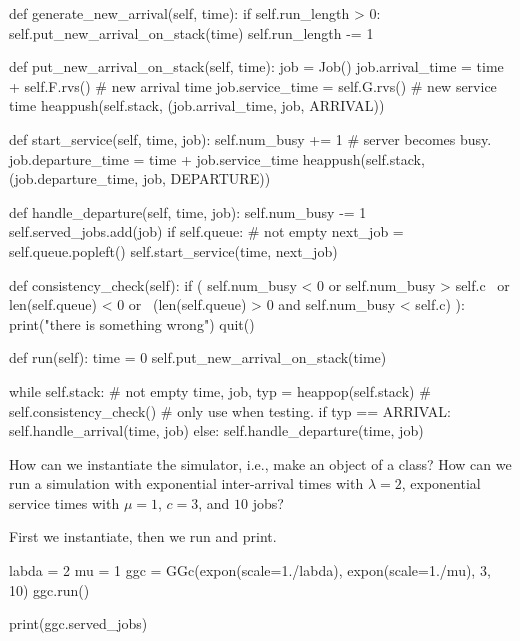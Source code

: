 \begin{exercise}
\begin{solution}
\begin{pyverbatim}
    def generate_new_arrival(self, time):
        if self.run_length > 0:
            self.put_new_arrival_on_stack(time)
            self.run_length -= 1

    def put_new_arrival_on_stack(self, time):
        job = Job()
        job.arrival_time = time + self.F.rvs()  # new arrival time
        job.service_time = self.G.rvs()  # new service time
        heappush(self.stack, (job.arrival_time, job, ARRIVAL))

    def start_service(self, time, job):
        self.num_busy += 1  # server becomes busy.
        job.departure_time = time + job.service_time
        heappush(self.stack, (job.departure_time, job, DEPARTURE))

    def handle_departure(self, time, job):
        self.num_busy -= 1
        self.served_jobs.add(job)
        if self.queue:  # not empty
            next_job = self.queue.popleft()
            self.start_service(time, next_job)

    def consistency_check(self):
        if ( self.num_busy < 0 or self.num_busy > self.c \
            or len(self.queue) < 0 or \
            (len(self.queue) > 0 and self.num_busy < self.c) ):
            print("there is something wrong")
            quit()

    def run(self):
        time = 0
        self.put_new_arrival_on_stack(time)

        while self.stack:  # not empty
            time, job, typ = heappop(self.stack)
            # self.consistency_check() # only use when testing.
            if typ == ARRIVAL:
                self.handle_arrival(time, job)
            else:
                self.handle_departure(time, job)


\end{pyverbatim}
\end{solution}
  
\end{exercise}

      

\begin{exercise}

How can we instantiate the  simulator, i.e., make an object of a class? How can we run a simulation with exponential inter-arrival times with $\lambda=2$, exponential service times with $\mu=1$, $c=3$, and $10$ jobs?
\begin{solution}
First we instantiate, then we run and print. 
\begin{pyverbatim}
labda = 2
mu = 1  
ggc = GGc(expon(scale=1./labda), expon(scale=1./mu), 3, 10)
ggc.run()

print(ggc.served_jobs)
\end{pyverbatim}
\end{solution}
\end{exercise}

